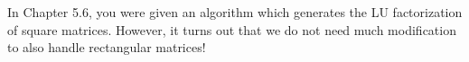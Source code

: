 In Chapter 5.6, you were given an algorithm which generates the LU factorization of square matrices. However, it turns out that we do not need much modification to also handle rectangular matrices!
 

